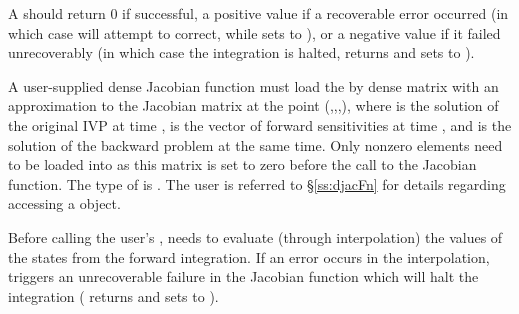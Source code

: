 {
  A  should return 0 if successful, a positive value if a recoverable
  error occurred (in which case {\cvodes} will attempt to correct, while {\cvdense} sets
   to ), or a negative 
  value if it failed unrecoverably (in which case the integration is halted, 
  returns  and {\cvdense} sets  to 
  ).
}
{
  A user-supplied dense Jacobian function must load the  by 
  dense matrix  with an approximation to the Jacobian matrix at the point 
  (,,,), where  is the solution of the original
  IVP at time ,  is the vector of forward sensitivities at time ,
  and  is the solution of the backward problem at the same time.
  Only nonzero elements need to be loaded into  as this matrix 
  is set to zero before the call to the Jacobian function. 
  The type of  is . The user is referred to 
  \S\ref{ss:djacFn} for details regarding accessing a  object.

  {\warn}Before calling the user's , {\cvodes} needs to evaluate
  (through interpolation) the values of the states from the forward integration. 
  If an error occurs in the interpolation, {\cvodes} triggers an unrecoverable
  failure in the Jacobian function which will halt the integration
  ( returns  and {\cvdense} sets  to 
  ).
}

